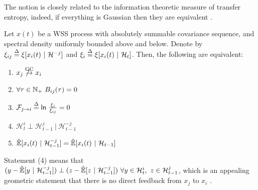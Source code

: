 \documentclass[12pt]{article}
\def\gc{\overset{\text{GC}}{\rightarrow}}  %
\def\H{\mathcal{H}}  %
\newcommand{\linE}[2]{\hat{\E}[#1\ |\ #2]}  %
\newcommand{\linEerr}[2]{\xi[#1\ |\ #2]}  %
\begin{document}
The notion is closely related to the information theoretic measure of
transfer entropy, indeed, if everything is Gaussian then they are
equivalent \cite{barnett2009granger}.

\begin{theorem}
  \label{thm:granger_causality_equivalences}
  Let $x(t)$ be a WSS process with absolutely summable covariance
  sequence, and spectral density uniformly bounded above and below.  Denote by
  $\xi_{ij} \defeq \linEerr{x_i(t)}{\H^{-j}}$ and
  $\xi_i \defeq \linEerr{x_i(t)}{\H_t}$.  Then, the following are equivalent:

  \begin{enumerate}
    \item{$x_j \not\gc x_i$}
    \item{$\forall \tau \in \N_+\ B_{ij}(\tau) = 0$}
    \item{$\mathcal{F}_{j \rightarrow i} \overset{\Delta}{=} \mathsf{ln\ }\frac{\xi_i}{\xi_{ij}} = 0$}
    \item{$\H_t^{i} \perp \H_{t - 1}^{j}\ |\ \H_{t - 1}^{-j}$}
    \item{$\linE{x_i(t)}{\H_{t - 1}^{-j}} = \linE{x_i(t)}{\H_{t - 1}}$}
  \end{enumerate}
\end{theorem}

Statement (4) means that
$(y - \linE{y}{\H_{t - 1}^{-j}}) \perp (z - \linE{z}{\H_{t -
    1}^{-j}})\ \forall y \in \H_t^i,\ z \in \H_{t - 1}^j$, which is an
appealing geometric statement that there is no direct feedback from
$x_j$ to $x_i$ \cite{lindquist}.
\end{document}
